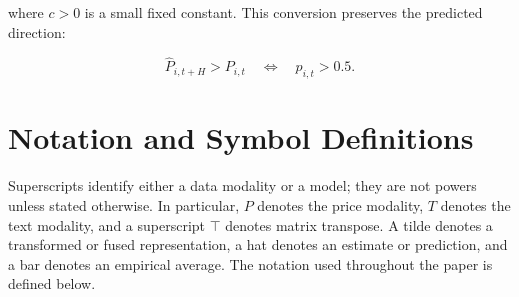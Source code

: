 \documentclass[11pt]{article}
\begin{document}
where $c>0$ is a small fixed constant. This conversion preserves the predicted
direction:

\begin{equation}
\widehat{P}_{i,t+H} > P_{i,t}
\quad\Longleftrightarrow\quad
p_{i,t}>0.5.
\end{equation}

\section{Notation and Symbol Definitions}

Superscripts identify either a data modality or a model; they are not powers
unless stated otherwise. In particular, $P$ denotes the price modality, $T$
denotes the text modality, and a superscript $\top$ denotes matrix transpose.
A tilde denotes a transformed or fused representation, a hat denotes an
estimate or prediction, and a bar denotes an empirical average. The notation
used throughout the paper is defined below.
\end{document}

